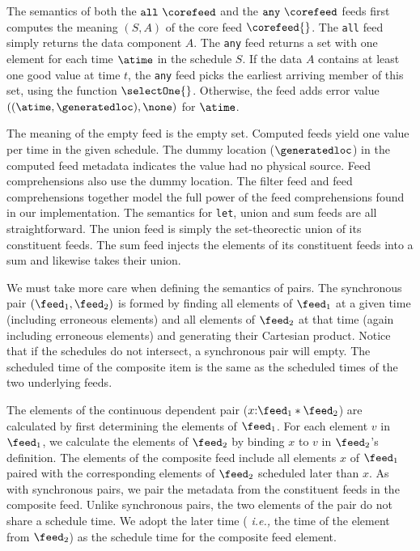 The semantics of both the $\mathtt{all}\ \corefeed$ and the
$\mathtt{any}\ \corefeed$ feeds first computes the meaning $(S,A)$ of the
core feed $\corefeed{}$.  The \texttt{all} feed simply returns the
data component $A$.  The \texttt{any} feed returns a set with one
element for each time $\atime$ in the schedule $S$.  If the data $A$
contains at least one good value at time $t$, the \texttt{any} feed
picks the earliest arriving member of this set, using the function
$\selectOne{}$.  Otherwise, the feed adds  
error value $((\atime,\generatedloc), \none)$ for $\atime$.

The meaning of the empty feed is the empty set.  Computed feeds yield
one value per time in the given schedule.  The dummy location
($\generatedloc$) in the computed feed metadata indicates the value had no physical
source.  Feed comprehensions also use the dummy location.  The filter feed and feed
comprehensions together model the full power of the feed
comprehensions found in our implementation. The semantics for
\texttt{let}, union and sum feeds are all straightforward.  The union
feed is simply the set-theorectic union of its constituent feeds.  The
sum feed injects the elements of its constituent feeds into a sum and
likewise takes their union.

We must take more care when defining the semantics of pairs.  The
synchronous pair $(\feed_1,\feed_2)$ is formed by finding all elements
of $\feed_1$ at a given time (including erroneous elements) and all
elements of $\feed_2$ at that time (again including erroneous
elements) and generating their Cartesian product.  Notice that if
the schedules do not intersect, a synchronous pair will empty.
The scheduled time of the composite item is the same as the scheduled
times of the two underlying feeds. 

The elements of the continuous dependent pair ($x{:}\feed_1 *
\feed_2$) are calculated by first determining the elements of
$\feed_1$.  For each element $v$ in $\feed_1$, we calculate the
elements of $\feed_2$ by binding $x$ to $v$ in $\feed_2$'s definition.
The elements of the composite feed include all elements $x$ of
$\feed_1$ paired with the corresponding elements of $\feed_2$
scheduled later than $x$.  As with synchronous pairs, we pair the
metadata from the constituent feeds in the composite feed. Unlike 
synchronous pairs, the two elements of the pair
do not share a schedule time.  We adopt the later time ({\em
  i.e.,} the time of the element from $\feed_2$) as the schedule time
for the composite feed element.

